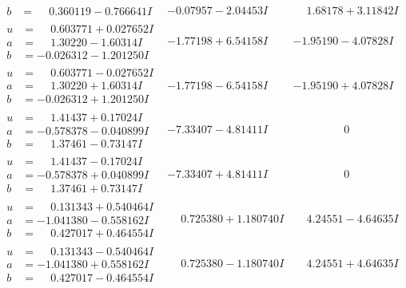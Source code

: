 \documentclass[1p]{elsarticle_modified}
\theoremstyle{definition}
\begin{document}
$$\begin{array}{c|c|c}
\begin{aligned}
b &= \phantom{-}0.360119 - 0.766641 I\end{aligned}
 & -0.07957 - 2.04453 I & \phantom{-}1.68178 + 3.11842 I \\ \hline\begin{aligned}
u &= \phantom{-}0.603771 + 0.027652 I \\
a &= \phantom{-}1.30220 - 1.60314 I \\
b &= -0.026312 - 1.201250 I\end{aligned}
 & -1.77198 + 6.54158 I & -1.95190 - 4.07828 I \\ \hline\begin{aligned}
u &= \phantom{-}0.603771 - 0.027652 I \\
a &= \phantom{-}1.30220 + 1.60314 I \\
b &= -0.026312 + 1.201250 I\end{aligned}
 & -1.77198 - 6.54158 I & -1.95190 + 4.07828 I \\ \hline\begin{aligned}
u &= \phantom{-}1.41437 + 0.17024 I \\
a &= -0.578378 - 0.040899 I \\
b &= \phantom{-}1.37461 - 0.73147 I\end{aligned}
 & -7.33407 - 4.81411 I & \phantom{-0.000000 } 0 \\ \hline\begin{aligned}
u &= \phantom{-}1.41437 - 0.17024 I \\
a &= -0.578378 + 0.040899 I \\
b &= \phantom{-}1.37461 + 0.73147 I\end{aligned}
 & -7.33407 + 4.81411 I & \phantom{-0.000000 } 0 \\ \hline\begin{aligned}
u &= \phantom{-}0.131343 + 0.540464 I \\
a &= -1.041380 - 0.558162 I \\
b &= \phantom{-}0.427017 + 0.464554 I\end{aligned}
 & \phantom{-}0.725380 + 1.180740 I & \phantom{-}4.24551 - 4.64635 I \\ \hline\begin{aligned}
u &= \phantom{-}0.131343 - 0.540464 I \\
a &= -1.041380 + 0.558162 I \\
b &= \phantom{-}0.427017 - 0.464554 I\end{aligned}
 & \phantom{-}0.725380 - 1.180740 I & \phantom{-}4.24551 + 4.64635 I \\ \hline\begin{aligned}

\end{aligned}
\end{array}$$
\end{document}
